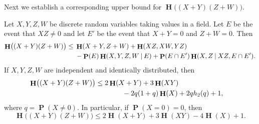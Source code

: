 \documentclass[twoside, 10pt]{article}
\DeclareMathOperator{\Eta}{\mathbf{H}}
\DeclareMathOperator{\pr}{\mathbf{P}}
\newcommand\given{\mathbin{|}}
\begin{document}
Next we establish a corresponding
upper bound for $\Eta\bigl((X+Y)(Z+W)\bigr)$.

\begin{lemma}\label{lempohoata}
Let $X,Y,Z,W$ be discrete random variables taking values in a field. Let $E$ be the event that $XZ\ne 0$ and let $E'$ be the event that $X+Y = 0$ and $Z+W=0$. Then
\[
\begin{aligned}\label{eq:pohoatageneral}
\Eta\bigl((X+Y)(Z+W)\bigr)
\le {}&
\Eta(X+Y,Z+W)+\Eta(XZ,XW,YZ) \notag\\
&-\pr(E)\Eta(X,Y,Z,W\given E) \notag +\pr(E\cap E') \notag \Eta(X,Z \given XZ, E\cap E').
\end{aligned}
\]
If $X,Y,Z,W$ are independent and identically
distributed, then
\[
\begin{aligned}\label{eq:pohoataiid}
\Eta\bigl((X+Y)(Z+W)\bigr)
\le 
2&\Eta(X+Y)+3\Eta(XY) \cr
&\qquad-2q(1+q)\Eta(X) +2q h_2(q)+1,\cr
\end{aligned}
\]
where $q=\pr(X\ne 0)$.
In particular, if $\pr(X=0)=0$, then
\[
\Eta\bigl((X+Y)(Z+W)\bigr)
\le
2\Eta(X+Y)+3\Eta(XY)-4\Eta(X)+1.
\]
\end{lemma}
\end{document}
